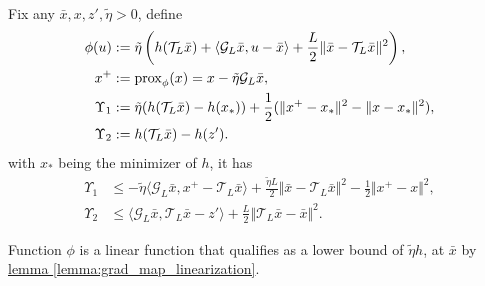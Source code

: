 \documentclass[12pt]{article}
\begin{document}
    \begin{lemma}
    \label{lemma:nsmooth_agg_lyapunov_upper_bound}\;\\
        Fix any $\bar x, x, z',\tilde\eta > 0$, define
        \begin{align*}
            \phi(u) &:= \tilde\eta
            \left(
                h( \mathcal T_L\bar x) + \langle \mathcal G_L\bar x, u - \bar x\rangle
                + \frac{L}{2}\Vert \bar x - \mathcal T_L \bar x\Vert^2 
            \right), 
            \\
            x^+ &:= 
            \operatorname{prox}_\phi(x) = x - \tilde \eta\mathcal G_L \bar x,
            \\
            \Upsilon_{1}  &:= 
            \tilde \eta(h(\mathcal T_L \bar x) - h(x_*))
            + 
            \frac{1}{2}(\Vert x^+ - x_*\Vert^2 - \Vert x - x_*\Vert^2), 
            \\
            \Upsilon_2 &:= 
            h(\mathcal T_L \bar x) - h(z'). 
        \end{align*}
        with $x_*$ being the minimizer of $h$, it has 
        \begin{align*}
            \Upsilon_1 &\le 
            - \tilde \eta \langle \mathcal G_L\bar x, x^+ - \mathcal T_L \bar x\rangle
            + 
            \frac{\tilde \eta L}{2} \Vert \bar x - \mathcal T_L \bar x\Vert^2
            - 
            \frac{1}{2}\Vert x^+ - x\Vert^2, 
            \\
            \Upsilon_2 &\le 
            \langle \mathcal G_L\bar x, \mathcal T_L \bar x - z'\rangle + 
            \frac{L}{2}\Vert \mathcal T_L \bar x - \bar x\Vert^2. 
        \end{align*}
    \end{lemma}
    \begin{observation}
        Function $\phi$ is a linear function that qualifies as a lower bound of $\tilde \eta h$, at $\bar x$ by 
        \hyperref[lemma:grad_map_linearization]{lemma \ref*{lemma:grad_map_linearization}}.
    \end{observation}
\end{document}
